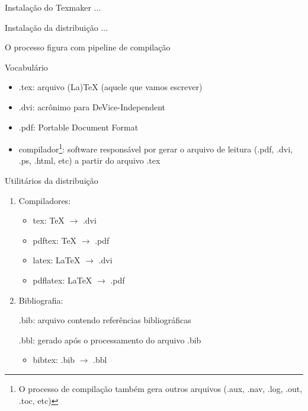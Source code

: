 \documentclass{beamer}
\begin{document}
\begin{frame}{Instala\c{c}\~ao do Texmaker}
    ...
\end{frame}

\begin{frame}{Instala\c{c}\~ao da distribui\c{c}\~ao}
    ...
\end{frame}

\begin{frame}{O processo}
    figura com pipeline de compila\c{c}\~ao
\end{frame}

\begin{frame}{Vocabul\'ario}
    \begin{itemize}
        \item .tex: arquivo (La)TeX (aquele que vamos escrever)
        \item .dvi: acr\^onimo para DeVice-Independent
        \item .pdf: Portable Document Format
        \item compilador\footnote{O processo de compila\c{c}\~ao tamb\'em gera outros
        arquivos (.aux, .nav, .log, .out, .toc, etc)}: software respons\'avel por
        gerar o arquivo de leitura (.pdf, .dvi, .ps, .html, etc) a partir do
        arquivo .tex
    \end{itemize}
\end{frame}

\begin{frame}{Utilit\'arios da distribui\c{c}\~ao}
    \begin{enumerate}
        \item Compiladores:
            \begin{itemize}
                \item tex: TeX $\rightarrow$ .dvi
                \item pdftex: TeX $\rightarrow$ .pdf
                \item latex: LaTeX $\rightarrow$ .dvi
                \item pdflatex: LaTeX $\rightarrow$ .pdf
            \end{itemize}
        \pause 
        \item Bibliografia:

            .bib: arquivo contendo refer\^encias bibliogr\'aficas

            .bbl: gerado ap\'os o processamento do arquivo .bib
            \begin{itemize}
                \item bibtex: .bib $\rightarrow$ .bbl
            \end{itemize}
    \end{enumerate}
\end{frame}
\end{document}
